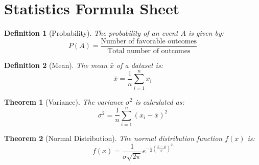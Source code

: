 \documentclass{article}
\newtheorem{definition}{Definition}
\newtheorem{theorem}{Theorem}
\begin{document}
\section*{Statistics Formula Sheet}

\begin{definition}[Probability]
The probability of an event \(A\) is given by:
$$
P(A) = \frac{\text{Number of favorable outcomes}}{\text{Total number of outcomes}}
$$
\end{definition}

\begin{definition}[Mean]
The mean \( \bar{x} \) of a dataset is:
$$
\bar{x} = \frac{1}{n} \sum_{i=1}^{n} x_i
$$
\end{definition}

\begin{theorem}[Variance]
The variance \( \sigma^2 \) is calculated as:
$$
\sigma^2 = \frac{1}{n} \sum_{i=1}^{n} (x_i - \bar{x})^2
$$
\end{theorem}

\begin{theorem}[Normal Distribution]
The normal distribution function \( f(x) \) is:
$$
f(x) = \frac{1}{\sigma \sqrt{2\pi}} e^{-\frac{1}{2} \left(\frac{x-\mu}{\sigma} \right)^2}
$$
\end{theorem}
\end{document}
